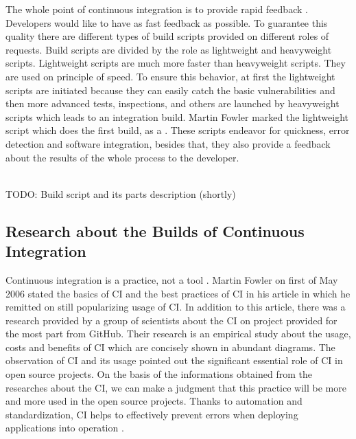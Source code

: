 The whole point of continuous integration is to provide rapid feedback \cite{MartinFowler}. Developers would like to have as fast feedback as possible. To guarantee this quality there are different types of build scripts provided on different roles of requests. Build scripts are divided by the role as lightweight and heavyweight scripts. Lightweight scripts are much more faster than heavyweight scripts. They are used on principle of speed. To ensure this behavior, at first the lightweight scripts are initiated because they can easily catch the basic vulnerabilities and then more advanced tests, inspections, and others are launched by heavyweight scripts which leads to an integration build. Martin Fowler marked the lightweight script which does the first build, as a  \cite{MartinFowler}. These scripts endeavor for quickness, error detection and software integration, besides that, they also provide a feedback about the results of the whole process to the developer.

\hfill\\
{\color{red}TODO: Build script and its parts description (shortly)}

\subsection{Research about the Builds of Continuous Integration}

Continuous integration is a practice, not a tool \cite{CollabNet}. Martin Fowler on first of May 2006 stated the basics of CI and the best practices of CI in his article in which he remitted on still popularizing usage of CI. In addition to this article, there was a research provided by a group of scientists about the CI on project provided for the most part from GitHub. Their research is an empirical study about the usage, costs and benefits of CI which are concisely shown in abundant diagrams. The observation of CI and its usage pointed out the significant essential role of CI in open source projects. On the basis of the informations obtained from the researches about the CI, we can make a judgment that this practice will be more and more used in the open source projects. Thanks to automation and standardization, CI helps to effectively prevent errors when deploying applications into operation \cite{CIcure}.\\

